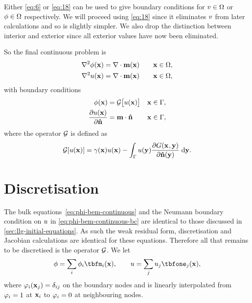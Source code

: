 Either \cref{eq:6} or \cref{eq:18} can be used to give boundary conditions for $v \in \Omega$ or $\phi \in \Omega$ respectively.
We will proceed using \cref{eq:18} since it eliminates $v$ from later calculations and so is slightly simpler.
We also drop the distinction between interior and exterior since all exterior values have now been eliminated.

So the final continuous problem is
\begin{equation}
  \begin{aligned}
    \nabla^2 \phi(\mathbf{x}) &= \nabla \cdot \mathbf{m}(\mathbf{x}) \quad & \mathbf{x} \in \Omega, \\
    \nabla^2 u(\mathbf{x}) &= \nabla \cdot \mathbf{m}(\mathbf{x})    & \mathbf{x} \in \Omega,
  \end{aligned}
  \label{eq:phi-bem-continuous}
\end{equation}
with boundary conditions
\begin{equation}
  \begin{aligned}
    \phi(\mathbf{x}) &= \mathcal{G} \big[ u(\mathbf{x}) \big]      & \mathbf{x} \in {\Gamma}, \\
    \frac{\partial u(\mathbf{x})}{\partial \mathbf{\hat{n}}} &= \mathbf{m} \cdot \mathbf{\hat{n}}  & \mathbf{x} \in {\Gamma},
    \label{eq:phi-bem-continuous-bc}
  \end{aligned}
\end{equation}
where the operator $\mathcal{G}$ is defined as
\begin{equation}
  \mathcal{G} {\left[ u(\mathbf{x}) \right]} = \gamma(\mathbf{x}) u(\mathbf{x}) 
        - \int_{{\Gamma}} u(\mathbf{y}) \frac{\partial G(\mathbf{x}_{},\mathbf{y})}{\partial \mathbf{\hat{n}}(\mathbf{y})} {\; \mathrm{{d}}} \mathbf{y}.
\end{equation}

\section{Discretisation}
\label{sec:discretisation}

\newsubcommand{\tbfone}{\tbf}{}
\newsubcommand{\tbfm}{\tbf}{}

The bulk equations~\cref{eq:phi-bem-continuous} and the Neumann boundary condition on $u$ in \cref{eq:phi-bem-continuous-bc} are identical to those discussed in \cref{sec:llg-initial-equations}.
As such the weak residual form, discretisation and Jacobian calculations are identical for these equations.
Therefore all that remains to be discretised is the operator $\mathcal{G}$.
We let
\begin{equation}
  \phim = \sum_\ibasis \phim_{\ibasis} \tbfm_{\ibasis}(\xv),
  \qquad
  \phione = \sum_\ibasisb \phione_{\ibasisb} \tbfone_{\ibasisb}(\xv),
  \label{eq:25}
\end{equation}
where $\varphi_{i}(\mathbf{x}_{j}) = \delta_{{i} {j}}$ on the boundary nodes and is linearly interpolated from $\varphi_{i} = 1$ at $\mathbf{x}_{i}$ to $\varphi_{i} = 0$ at neighbouring nodes.

